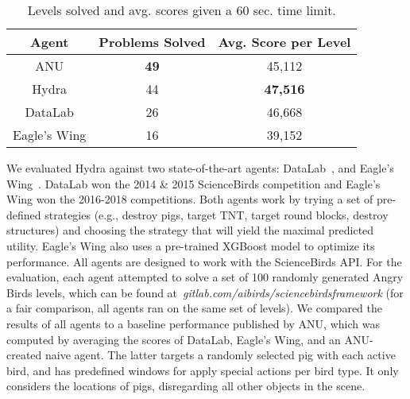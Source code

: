 \documentclass[letterpaper]{article} %
\begin{document}
\begin{table}[tb!]
\centering
\small
\begin{tabular}{|c|c|c|}
\hline
\textbf{Agent} & \textbf{Problems Solved} & \textbf{Avg. Score per Level} \\ \hline
ANU    & \textbf{49}              & 45,112                      \\ \hline
Hydra          & 44                       & \textbf{47,516}             \\ \hline
DataLab        & 26                       & 46,668                      \\ \hline
Eagle's  Wing  & 16                       & 39,152                      \\ \hline
\end{tabular}
\caption{Levels solved and avg. scores given a 60 sec. time limit.}
\label{tab:results}
\end{table}



We evaluated Hydra against two state-of-the-art agents:
DataLab~\cite{borovicka2014datalab}, and
Eagle's Wing~\cite{wang2017description}.
DataLab won the 2014 \& 2015 ScienceBirds competition and Eagle's Wing won the 2016-2018 competitions.
Both agents work by trying a set of pre-defined strategies (e.g., destroy pigs, target TNT, target round blocks, destroy structures) and choosing the strategy that will yield the maximal predicted utility.
Eagle's Wing also uses a pre-trained XGBoost model to optimize its performance. %
All agents are designed to work with the ScienceBirds API. For the evaluation, each agent attempted to solve a set of 100 randomly generated Angry Birds levels, which can be found at~\emph{gitlab.com/aibirds/sciencebirdsframework} (for a fair comparison, all agents ran on the same set of levels).
We compared the results of all agents to a baseline performance published by ANU, which was computed by averaging the scores of
DataLab,
Eagle's Wing,
and an ANU-created naive agent.
The latter targets a randomly selected pig with each active bird, and has predefined windows for apply special actions per bird type. It only considers the locations of pigs, disregarding all other objects in the scene.
\end{document}
